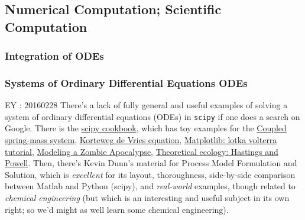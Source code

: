 \documentclass[10pt]{amsart}
\begin{document}
\begin{multicols*}{2}


\part{Numerical Computation; Scientific Computation}

\section{Integration of ODEs}




\section{Systems of Ordinary Differential Equations ODEs}

EY : 20160228 There's a lack of fully general and useful examples of solving a system of ordinary differential equations (ODEs) in \verb|scipy| if one does a search on Google.  There is the \href{http://scipy-cookbook.readthedocs.org/items/numpy_scipy_ordinary_differential_equations.html}{scipy cookbook}, which has toy examples for the \href{http://scipy-cookbook.readthedocs.org/items/CoupledSpringMassSystem.html}{Coupled spring-mass system}, \href{http://scipy-cookbook.readthedocs.org/items/KdV.html}{Korteweg de Vries equation}, \href{http://scipy-cookbook.readthedocs.org/items/LoktaVolterraTutorial.html}{Matplotlib: lotka volterra tutorial}, \href{http://scipy-cookbook.readthedocs.org/items/Zombie_Apocalypse_ODEINT.html}{Modeling a Zombie Apocalypse}, \href{http://scipy-cookbook.readthedocs.org/items/Theoretical_Ecology_Hastings_and_Powell.html}{Theoretical ecology: Hastings and Powell}.  Then, there's Kevin Dunn's material for Process Model Formulation and Solution, which is \emph{excellent} for its layout, thoroughness, side-by-side comparison between Matlab and Python (scipy), and \emph{real-world} examples, though related to \emph{chemical engineering} (but which is an interesting and useful subject in its own right; so we'd might as well learn some chemical engineering).    


\end{multicols*}
\end{document}
